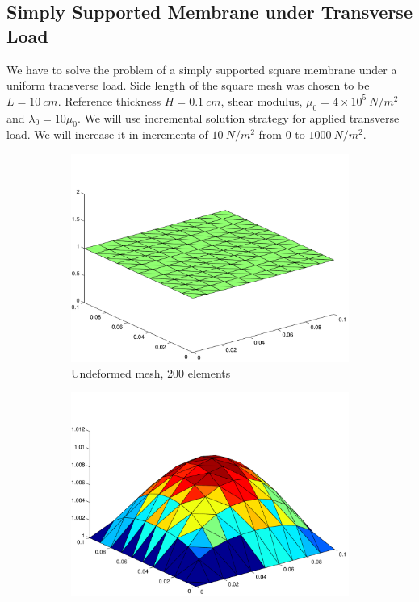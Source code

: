 \documentclass[../main.tex]{subfiles}
\begin{document}
\subsection{Simply Supported Membrane under Transverse Load}
We have to solve the problem of a simply supported square membrane
under a uniform transverse load. Side length of the square mesh was
chosen to be $L = 10\ cm$. Reference thickness $H = 0.1\ cm$, shear
modulus, $\mu_0 = 4\times10^5\ N/m^2$ and $\lambda_0 = 10\mu_0$. We
will use incremental solution strategy for applied transverse load. We
will increase it in increments of $10\ N/m^2$ from $0$ to
$1000\ N/m^2$.
\begin{figure}[ht]
  \centering
  \begin{subfigure}[b]{0.3\textwidth}
    \includegraphics[scale=0.3]{./img/initialMesh.pdf}
    \caption{Undeformed mesh, 200 elements}
    \label{fig:prob3initialMesh}
  \end{subfigure}%
  \begin{subfigure}[b]{0.3\textwidth}
    \includegraphics[scale=0.3]{./img/halfDeformedMesh.pdf}

\end{subfigure}
\end{figure}
\end{document}
